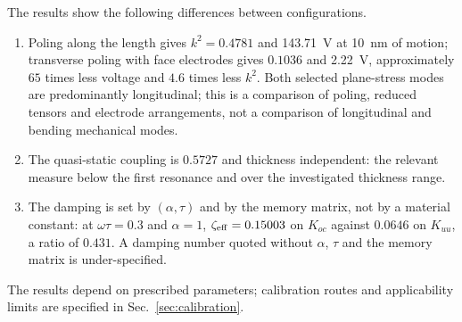 The results show the following differences between configurations.

\begin{enumerate}
\item Poling along the length
  gives $k^2=0.4781$ and \SI{143.71}{\volt} at \SI{10}{\nano\meter} of motion;
  transverse poling with face electrodes gives $0.1036$ and \SI{2.22}{\volt},
  approximately $65$ times less voltage and $4.6$ times less $k^2$.
  Both selected plane-stress modes are predominantly longitudinal; this is
  a comparison of poling, reduced tensors and electrode arrangements,
  not a comparison of longitudinal and bending mechanical modes.
\item The quasi-static coupling is $0.5727$ and thickness independent:
  the relevant measure below the first resonance and over the
  investigated thickness range.
\item The damping is set by $(\alpha,\tau)$ and by the memory matrix,
  not by a material constant: at $\omega\tau=0.3$ and $\alpha=1$,
  $\zeta_{\rm eff}=0.15003$ on $K_{oc}$ against $0.0646$ on $K_{uu}$, a
  ratio of $0.431$. A damping number quoted without $\alpha$, $\tau$ and the
  memory matrix is under-specified.
\end{enumerate}

The results depend on prescribed parameters; calibration routes and
applicability limits are specified in Sec.~\ref{sec:calibration}.

\FloatBarrier
